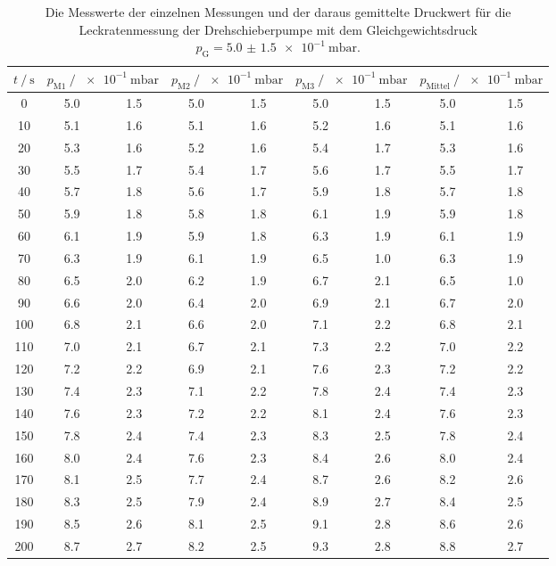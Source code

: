   \begin{table}[h]
    \centering
    \caption{Die Messwerte der einzelnen Messungen und der daraus gemittelte Druckwert für die Leckratenmessung der Drehschieberpumpe mit dem 
    Gleichgewichtsdruck $p_\text{G} = \SI{5.0(15)e-1}{\milli\bar}$.}
    \label{tab:dreh_leck_05}
    \begin{tabular}{S[table-format=3.0] S @{${}\pm{}$} S S @{${}\pm{}$} S S @{${}\pm{}$} S S @{${}\pm{}$} S}
    \toprule
    {$t \mathbin{/} \si{\second} $} &  &  &  &  \\
     & 5.0 & 1.5 & 5.0 & 1.5 & 5.0 & 1.5 & 5.0 & 1.5 \\  
      10 & 5.1 & 1.6 & 5.1 & 1.6 & 5.2 & 1.6 & 5.1 & 1.6 \\
      20 & 5.3 & 1.6 & 5.2 & 1.6 & 5.4 & 1.7 & 5.3 & 1.6 \\
      30 & 5.5 & 1.7 & 5.4 & 1.7 & 5.6 & 1.7 & 5.5 & 1.7 \\
      40 & 5.7 & 1.8 & 5.6 & 1.7 & 5.9 & 1.8 & 5.7 & 1.8 \\
      50 & 5.9 & 1.8 & 5.8 & 1.8 & 6.1 & 1.9 & 5.9 & 1.8 \\
      60 & 6.1 & 1.9 & 5.9 & 1.8 & 6.3 & 1.9 & 6.1 & 1.9 \\
      70 & 6.3 & 1.9 & 6.1 & 1.9 & 6.5 & 1.0 & 6.3 & 1.9 \\
      80 & 6.5 & 2.0 & 6.2 & 1.9 & 6.7 & 2.1 & 6.5 & 1.0 \\
      90 & 6.6 & 2.0 & 6.4 & 2.0 & 6.9 & 2.1 & 6.7 & 2.0 \\
     100 & 6.8 & 2.1 & 6.6 & 2.0 & 7.1 & 2.2 & 6.8 & 2.1 \\
     110 & 7.0 & 2.1 & 6.7 & 2.1 & 7.3 & 2.2 & 7.0 & 2.2 \\
     120 & 7.2 & 2.2 & 6.9 & 2.1 & 7.6 & 2.3 & 7.2 & 2.2 \\
     130 & 7.4 & 2.3 & 7.1 & 2.2 & 7.8 & 2.4 & 7.4 & 2.3 \\
     140 & 7.6 & 2.3 & 7.2 & 2.2 & 8.1 & 2.4 & 7.6 & 2.3 \\
     150 & 7.8 & 2.4 & 7.4 & 2.3 & 8.3 & 2.5 & 7.8 & 2.4 \\
     160 & 8.0 & 2.4 & 7.6 & 2.3 & 8.4 & 2.6 & 8.0 & 2.4 \\
     170 & 8.1 & 2.5 & 7.7 & 2.4 & 8.7 & 2.6 & 8.2 & 2.6 \\
     180 & 8.3 & 2.5 & 7.9 & 2.4 & 8.9 & 2.7 & 8.4 & 2.5 \\
     190 & 8.5 & 2.6 & 8.1 & 2.5 & 9.1 & 2.8 & 8.6 & 2.6 \\
     200 & 8.7 & 2.7 & 8.2 & 2.5 & 9.3 & 2.8 & 8.8 & 2.7 \\
    \bottomrule
    \end{tabular}
  \end{table}

